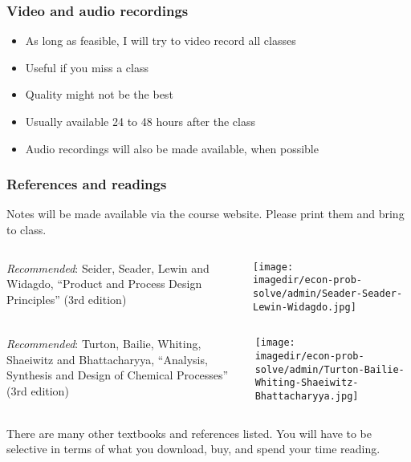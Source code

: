 \begin{frame}\frametitle{Video and audio recordings}
	\begin{itemize}
		\item	As long as feasible, I will try to video record all classes
		\item	Useful if you miss a class
		\item	Quality might not be the best
		\item	Usually available 24 to 48 hours after the class
		\item	Audio recordings will also be made available, when possible
	\end{itemize}
\end{frame}

\begin{frame}\frametitle{References and readings}

	Notes will be made available via the course website. Please print them and bring to class.


	\vspace{12pt}

	\begin{columns}[t]
			\emph{Recommended}: Seider, Seader, Lewin and Widagdo, ``Product and Process Design Principles'' (3rd edition)
			\vspace{-1cm}
			\begin{center}
				\texttt{[image: \\imagedir/econ-prob-solve/admin/Seader-Seader-Lewin-Widagdo.jpg]}
			\end{center}
	\end{columns}

	\vspace{12pt}
	\begin{columns}[t]
			\emph{Recommended}: Turton, Bailie, Whiting, Shaeiwitz and Bhattacharyya, ``Analysis, Synthesis and Design of Chemical Processes'' (3rd edition)
			\vspace{-1cm}
			\begin{center}
				\texttt{[image: \\imagedir/econ-prob-solve/admin/Turton-Bailie-Whiting-Shaeiwitz-Bhattacharyya.jpg]}
			\end{center}
	\end{columns}


	\vspace{12pt}
	There are many other textbooks and references listed. You will have to be selective in terms of what you download, buy, and spend your time reading.
\end{frame}

